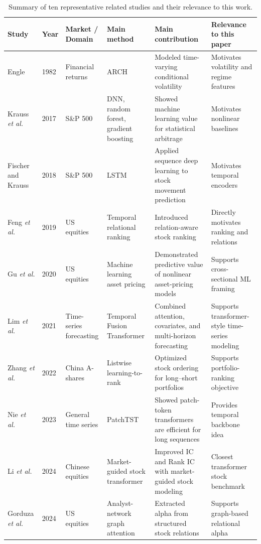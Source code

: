 \documentclass[conference]{IEEEtran}
\begin{document}
\begin{table}[t]
\centering
\caption{Summary of ten representative related studies and their relevance to this work.}
\label{tab:related_work}
\footnotesize
\setlength{\tabcolsep}{3pt}
\begin{tabular}{p{3.0cm}p{0.9cm}p{2.1cm}p{2.7cm}p{4.0cm}p{3.2cm}}
\toprule
Study & Year & Market / Domain & Main method & Main contribution & Relevance to this paper \\
\midrule
Engle \cite{engle1982autoregressive} & 1982 & Financial returns & ARCH & Modeled time-varying conditional volatility & Motivates volatility and regime features \\
Krauss \emph{et al.} \cite{krauss2017deep} & 2017 & S\&P 500 & DNN, random forest, gradient boosting & Showed machine learning value for statistical arbitrage & Motivates nonlinear baselines \\
Fischer and Krauss \cite{fischer2018deep} & 2018 & S\&P 500 & LSTM & Applied sequence deep learning to stock movement prediction & Motivates temporal encoders \\
Feng \emph{et al.} \cite{feng2019temporal} & 2019 & US equities & Temporal relational ranking & Introduced relation-aware stock ranking & Directly motivates ranking and relations \\
Gu \emph{et al.} \cite{gu2020empirical} & 2020 & US equities & Machine learning asset pricing & Demonstrated predictive value of nonlinear asset-pricing models & Supports cross-sectional ML framing \\
Lim \emph{et al.} \cite{lim2021temporal} & 2021 & Time-series forecasting & Temporal Fusion Transformer & Combined attention, covariates, and multi-horizon forecasting & Supports transformer-style time-series modeling \\
Zhang \emph{et al.} \cite{zhang2022listwise} & 2022 & China A-shares & Listwise learning-to-rank & Optimized stock ordering for long--short portfolios & Supports portfolio-ranking objective \\
Nie \emph{et al.} \cite{nie2023patchtst} & 2023 & General time series & PatchTST & Showed patch-token transformers are efficient for long sequences & Provides temporal backbone idea \\
Li \emph{et al.} \cite{li2024master} & 2024 & Chinese equities & Market-guided stock transformer & Improved IC and Rank IC with market-guided stock modeling & Closest transformer stock benchmark \\
Gorduza \emph{et al.} \cite{gorduza2024analyst} & 2024 & US equities & Analyst-network graph attention & Extracted alpha from structured stock relations & Supports graph-based relational alpha \\
\bottomrule
\end{tabular}
\end{table}
\end{document}
